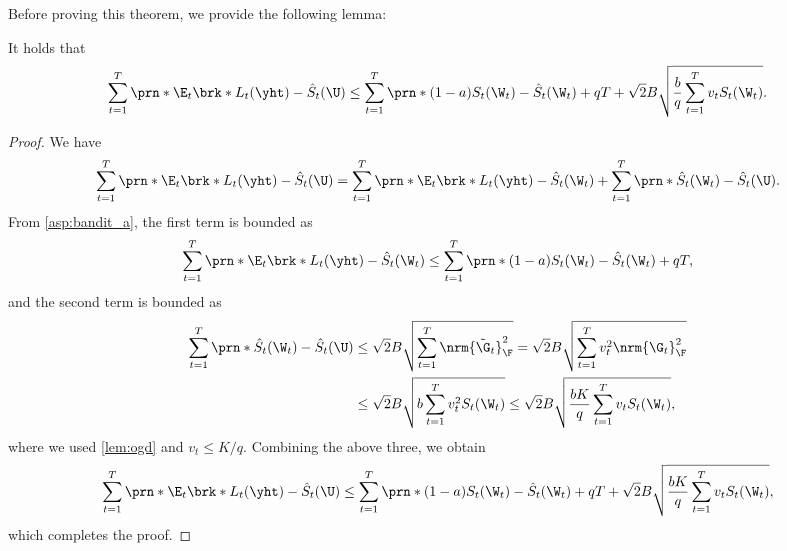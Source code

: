 Before proving this theorem, we provide the following lemma:
\begin{lemma}\label{lem:hp_pre}
It holds that 
\begin{equation}
    \sum_{t=1}^T \prn*{ \E_t\brk*{L_t(\yht)} - \hat{S}_t(\U) }
    \leq
    \sum_{t=1}^T \prn*{ (1-a) S_t(\W_t) - \hat{S}_t(\W_t)  } + q T
    +
    \sqrt{2} B \sqrt{\frac{b}{q} \sum_{t=1}^T v_t S_t(\W_t) }
    .
    \nonumber
\end{equation}
\end{lemma}
\begin{proof}
We have 
\begin{equation}
    \sum_{t=1}^T \prn*{ \E_t\brk*{L_t(\yht)} - \hat{S}_t(\U) }
    =
    \sum_{t=1}^T \prn*{ \E_t\brk*{L_t(\yht)} - \hat{S}_t(\W_t)  }
    +
    \sum_{t=1}^T \prn*{ \hat{S}_t(\W_t) - \hat{S}_t(\U) }.
    \nonumber
\end{equation}
From \cref{asp:bandit_a}, the first term is bounded as 
\begin{align}
    \sum_{t=1}^T \prn*{ \E_t\brk*{L_t(\yht)} - \hat{S}_t(\W_t)  }
    \leq
    \sum_{t=1}^T \prn*{ (1-a) S_t(\W_t) - \hat{S}_t(\W_t)  } + q T,
    \nonumber
\end{align}
and 
the second term is bounded as 
\begin{align}
    \sum_{t=1}^T \prn*{ \hat{S}_t(\W_t) - \hat{S}_t(\U) }
    &\leq
    \sqrt{2} B \sqrt{\sum_{t=1}^T \nrm{\tilde{\G}_t}_{\F}^2 }
    =
    \sqrt{2} B \sqrt{\sum_{t=1}^T v_t^2 \nrm{\G_t}_{\F}^2 }
    \nonumber \\
    &\leq
    \sqrt{2} B \sqrt{b \sum_{t=1}^T v_t^2 S_t(\W_t) }
    \leq
    \sqrt{2} B \sqrt{\frac{b K}{q} \sum_{t=1}^T v_t S_t(\W_t) },
    \nonumber
\end{align}
where we used \cref{lem:ogd} and $v_t \leq K / q$.
Combining the above three, we obtain
\begin{equation}
    \sum_{t=1}^T \prn*{ \E_t\brk*{L_t(\yht)} - \hat{S}_t(\U) }
    \leq
    \sum_{t=1}^T \prn*{ (1-a) S_t(\W_t) - \hat{S}_t(\W_t)  } + q T
    +
    \sqrt{2} B \sqrt{\frac{b K}{q} \sum_{t=1}^T v_t S_t(\W_t) }
    ,
    \nonumber
\end{equation}
which completes the proof.
\end{proof}


